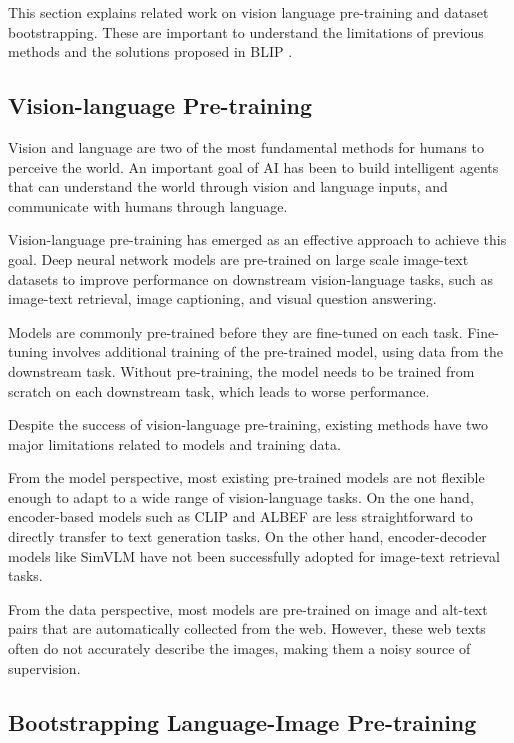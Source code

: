 \documentclass[11pt]{article}
\begin{document}
This section explains related work on vision language pre-training and dataset bootstrapping. These are important to understand the limitations of previous methods and the solutions proposed in BLIP \cite{li2022blip}.

\subsection{Vision-language Pre-training}

Vision and language are two of the most fundamental methods for humans to perceive the world. An important goal of AI has been to build intelligent agents that can understand the world through vision and language inputs, and communicate with humans through language.

Vision-language pre-training has emerged as an effective approach to achieve this goal. Deep neural network models are pre-trained on large scale image-text datasets to improve performance on downstream vision-language tasks, such as image-text retrieval, image captioning, and visual question answering.

Models are commonly pre-trained before they are fine-tuned on each task. Fine-tuning involves additional training of the pre-trained model, using data from the downstream task. Without pre-training, the model needs to be trained from scratch on each downstream task, which leads to worse performance.

Despite the success of vision-language pre-training, existing methods have two major limitations related to models and training data.

From the model perspective, most existing pre-trained models are not flexible enough to adapt to a wide range of vision-language tasks. On the one hand, encoder-based models such as CLIP \cite{radford2021learning} and ALBEF \cite{li2021align} are less straightforward to directly transfer to text generation tasks. On the other hand, encoder-decoder models like SimVLM \cite{wang2021simvlm} have not been successfully adopted for image-text retrieval tasks.

From the data perspective, most models are pre-trained on image and alt-text pairs that are automatically collected from the web. However, these web texts often do not accurately describe the images, making them a noisy source of supervision.

\subsection{Bootstrapping Language-Image Pre-training}
\end{document}
